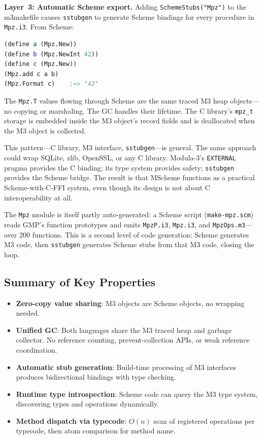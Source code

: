 \documentclass[11pt]{article}
\begin{document}
\textbf{Layer~3: Automatic Scheme export.}  Adding
\texttt{SchemeStubs("Mpz")} to the m3makefile causes \texttt{sstubgen}
to generate Scheme bindings for every procedure in \texttt{Mpz.i3}.
From Scheme:

\begin{lstlisting}[language=Scheme]
(define a (Mpz.New))
(define b (Mpz.NewInt 42))
(define c (Mpz.New))
(Mpz.add c a b)
(Mpz.Format c)    ;=> "42"
\end{lstlisting}

The \texttt{Mpz.T} values flowing through Scheme are the same traced
M3 heap objects---no copying or marshaling.  The GC handles their
lifetime.  The C library's \texttt{mpz\_t} storage is embedded inside
the M3 object's record fields and is deallocated when the M3 object
is collected.

This pattern---C library, M3 interface, \texttt{sstubgen}---is
general.  The same approach could wrap SQLite, zlib, OpenSSL, or any
C library.  Modula-3's \texttt{EXTERNAL} pragma provides the C
binding; its type system provides safety; \texttt{sstubgen} provides
the Scheme bridge.  The result is that MScheme functions as a
practical Scheme-with-C-FFI system, even though its design is not
about C interoperability at all.

The \texttt{Mpz} module is itself partly auto-generated: a Scheme
script (\texttt{make-mpz.scm}) reads GMP's function prototypes and
emits \texttt{MpzP.i3}, \texttt{Mpz.i3}, and
\texttt{MpzOps.m3}---over 200 functions.  This is a second level of
code generation: Scheme generates M3 code, then \texttt{sstubgen}
generates Scheme stubs from that M3 code, closing the loop.


\subsection{Summary of Key Properties}
\label{sec:summary}

\begin{itemize}
\item \textbf{Zero-copy value sharing}: M3 objects are Scheme objects,
  no wrapping needed.
\item \textbf{Unified GC}: Both languages share the M3 traced heap
  and garbage collector.  No reference counting, prevent-collection
  APIs, or weak reference coordination.
\item \textbf{Automatic stub generation}: Build-time processing of M3
  interfaces produces bidirectional bindings with type checking.
\item \textbf{Runtime type introspection}: Scheme code can query the
  M3 type system, discovering types and operations dynamically.
\item \textbf{Method dispatch via typecode}: $O(n)$ scan of
  registered operations per typecode, then atom comparison for method
  name.
\end{itemize}
\end{document}
